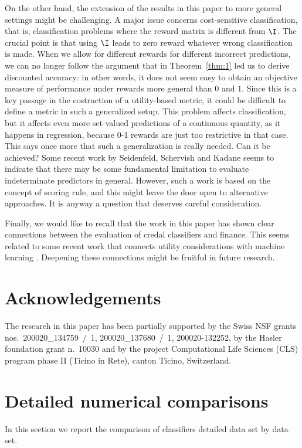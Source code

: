 \documentclass[a4paper,10pt,reqno]{amsart}
\theoremstyle{remark}
\begin{document}
On the other hand, the extension of the results in this paper to more general settings might be challenging. A major issue concerns cost-sensitive classification, that is, classification problems where the reward matrix is different from $\I$. The crucial point is that using $\I$ leads to zero reward whatever wrong classification is made. When we allow for different rewards for different incorrect predictions, we can no longer follow the argument that in Theorem~\ref{thm:1} led us to derive discounted accuracy: in other words, it does not seem easy to obtain an objective measure of performance under rewards more general than $0$ and $1$. Since this is a key passage in the costruction of a utility-based metric, it could be difficult to define a metric in such a generalized setup. This problem affects classification, but it affects even more set-valued predictions of a continuous quantity, as it happens in regression, because 0-1 rewards are just too restrictive in that case. This says once more that such a generalization is really needed. Can it be achieved? Some recent work by Seidenfeld, Schervish and Kadane \cite{seidenfeld2011a} seems to indicate that there may be some fundamental limitation to evaluate indeterminate predictors in general. However, such a work is based on the concept of scoring rule, and this might leave the door open to alternative approaches. It is anyway a question that deserves careful consideration.

Finally, we would like to recall that the work in this paper has shown clear connections between the evaluation of credal classifiers and finance. This seems related to some recent work that connects utility considerations with machine learning \cite{friedman2011}. Deepening these connections might be fruitful in future research.

\section*{Acknowledgements}
The research in this paper has been partially supported by the Swiss NSF grants nos.~200020\_134759~/~1, 200020\_137680~/~1, 200020-132252, by the Hasler foundation grant n.~10030 and by the project Computational Life Sciences (CLS) program phase II (Ticino in Rete), canton Ticino, Switzerland.




\appendix 
\section{Detailed numerical comparisons}\label{sec:app}
In this section we report the comparison of classifiers detailed data set by data set.
\end{document}
